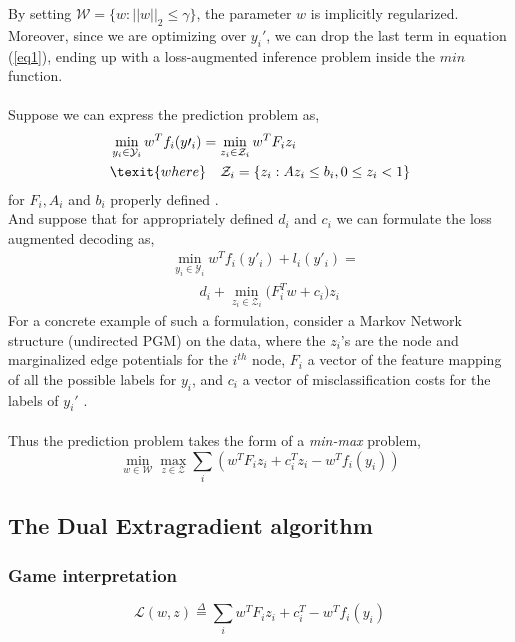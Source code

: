 \documentclass{article}
\begin{document}
By setting $\mathcal{W}=\{ w: || w||_{2}\leq \gamma\}$, the parameter $ w$ is implicitly regularized. Moreover, since we are
optimizing over $ y_i'$, we can drop the last term in equation (\ref{eq1}), ending
up with a loss-augmented inference problem inside the $min$ function.\\
\\
Suppose we can express the prediction problem as,
\begin{equation*}
\begin{aligned}
    &\min_{ y_{i} \in \mathcal{Y}_{i}} w^{T}f_{i}(y\prime_{i})= \min_{ z_{i} \in \mathcal{Z}_{i}} w^{T}F_{i}z_{i}\\
    &\texit{where}\quad \mathcal{Z}_{i}=\{z_{i}: Az_{i}\leq b_{i}, 0\leq z_{i} < 1\}
\end{aligned}
\end{equation*}
for $F_{i}, A_{i}$ and $b_{i}$ properly defined \cite{Taskaretal06}.\\ And suppose that for appropriately defined $d_{i}$ and $c_{i}$ we can formulate the loss augmented decoding as,
\begin{equation*}
\begin{aligned}
    &\min_{ y_{i} \in \mathcal{Y}_{i}} w^{T}f_{i}(y\prime_{i})+ l_{i}(y\prime_{i})=\\
    &\quad\quad d_{i}+ \min_{ z_{i} \in \mathcal{Z}_{i}}\Big(F^{T}_{i}w+ c_{i}\Big)z_{i}
\end{aligned}
\end{equation*}
For a concrete example of such a formulation, consider a Markov Network structure (undirected PGM) on the data, where the $ z_i$'s are the node and marginalized edge potentials for the $i^{th}$ node, $ F_i$ a vector of the feature mapping of all the possible labels for $ y_i$, and $ c_i$ a vector of misclassification costs for the labels of $ y_i'$ \cite{Taskaretal06}.\\
\\
Thus the prediction problem takes the form of a \textit{min-max} problem,
\begin{equation}
  \min_{ w \in \mathcal{W}} \max_{ z \in \mathcal{Z}} \sum_i \left( 
w^T  F_i  z_i +  c_i^T  z_i -  w^T  f_i( y_i)
\right)
  \label{saddle_point}
\end{equation}
\subsection{The Dual Extragradient algorithm}
\subsubsection{Game interpretation}
\begin{equation}
  \mathcal{L}( w, z) \overset{\Delta}{=} \sum_i  w^T  F_i  z_i + 
c_i^T -  w^T  f_i( y_i)
  \label{saddle_obj}
\end{equation}
\end{document}
